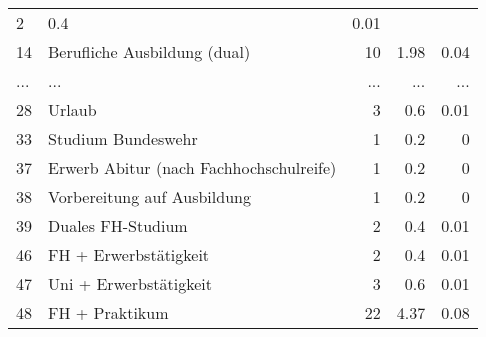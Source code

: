 \begin{longtable}{lXrrr}
          \num{2} &
          \num[round-mode=places,round-precision=2]{0,4} &
          \num[round-mode=places,round-precision=2]{0,01} \\
        14 & \multicolumn{1}{X}{Berufliche Ausbildung (dual)} & %
          \num{10} &
          \num[round-mode=places,round-precision=2]{1,98} &
          \num[round-mode=places,round-precision=2]{0,04} \\
       ... & ... & ... & ... & ... \\
        28 & \multicolumn{1}{X}{Urlaub} & %
          \num{3} &
          \num[round-mode=places,round-precision=2]{0,6} &
          \num[round-mode=places,round-precision=2]{0,01} \\

        33 & \multicolumn{1}{X}{Studium Bundeswehr} & %
          \num{1} &
          \num[round-mode=places,round-precision=2]{0,2} &
          \num[round-mode=places,round-precision=2]{0} \\

        37 & \multicolumn{1}{X}{Erwerb Abitur (nach Fachhochschulreife)} & %
          \num{1} &
          \num[round-mode=places,round-precision=2]{0,2} &
          \num[round-mode=places,round-precision=2]{0} \\

        38 & \multicolumn{1}{X}{Vorbereitung auf Ausbildung} & %
          \num{1} &
          \num[round-mode=places,round-precision=2]{0,2} &
          \num[round-mode=places,round-precision=2]{0} \\

        39 & \multicolumn{1}{X}{Duales FH-Studium} & %
          \num{2} &
          \num[round-mode=places,round-precision=2]{0,4} &
          \num[round-mode=places,round-precision=2]{0,01} \\

        46 & \multicolumn{1}{X}{FH + Erwerbstätigkeit} & %
          \num{2} &
          \num[round-mode=places,round-precision=2]{0,4} &
          \num[round-mode=places,round-precision=2]{0,01} \\

        47 & \multicolumn{1}{X}{Uni + Erwerbstätigkeit} & %
          \num{3} &
          \num[round-mode=places,round-precision=2]{0,6} &
          \num[round-mode=places,round-precision=2]{0,01} \\

        48 & \multicolumn{1}{X}{FH + Praktikum} & %
          \num{22} &
          \num[round-mode=places,round-precision=2]{4,37} &
          \num[round-mode=places,round-precision=2]{0,08} \\


\end{longtable}
